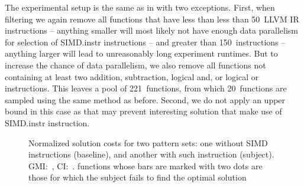 The experimental setup is the same as in 
with two exceptions.
%
First, when filtering we again remove all \glspl{function} that have less than
less than \num{50}~\gls{LLVM} \gls{IR} \glspl{instruction} -- anything smaller
will most likely not have enough data parallelism for selection of
\gls{SIMD.instr} \glspl{instruction} -- and greater than
\num{150}~\glspl{instruction} -- anything larger will lead to unreasonably long
experiment runtimes.
%
But to increase the chance of data parallelism, we also remove all
\glspl{function} not containing at least two addition, subtraction, logical and,
or logical or \glspl{instruction}.
%
This leaves a pool of \num{221}~\glspl{function}, from which
\num{20}~\glspl{function} are sampled using the same method as before.
%
Second, we do not apply an upper bound in this case as that may prevent
interesting \gls{solution} that make use of \gls{SIMD.instr} \gls{instruction}.



\begin{figure}
  \centering%
  \maxsizebox{\textwidth}{!}{%
    \trimBarchartPlot{%
    }%
  }

  \caption[Plot for evaluating the impact of SIMD instructions on code quality]%
          {%
            Normalized solution costs for two pattern sets: one without SIMD
            instructions (baseline), and another with such instruction
            (subject).
            GMI:~\printGMI{%
              \SimdVsWithoutCyclesSpeedupCyclesRegularSpeedupGmean%
            },
            CI:~\printGMICI{%
              \SimdVsWithoutCyclesSpeedupCyclesRegularSpeedupCiMin%
            }{%
              \SimdVsWithoutCyclesSpeedupCyclesRegularSpeedupCiMax%
            }.
            \Glspl{function} whose bars are marked with two dots are those
            for which the \gls{subject} fails to find the optimal solution%
          }
\end{figure}

